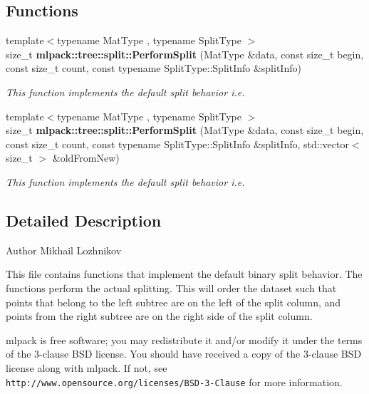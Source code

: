 \subsection*{Functions}
\begin{DoxyCompactItemize}
\item 
{\footnotesize template$<$typename Mat\+Type , typename Split\+Type $>$ }\\size\+\_\+t {\bf mlpack\+::tree\+::split\+::\+Perform\+Split} (Mat\+Type \&data, const size\+\_\+t begin, const size\+\_\+t count, const typename Split\+Type\+::\+Split\+Info \&split\+Info)
\begin{DoxyCompactList}\small\item\em This function implements the default split behavior i.\+e. \end{DoxyCompactList}\item 
{\footnotesize template$<$typename Mat\+Type , typename Split\+Type $>$ }\\size\+\_\+t {\bf mlpack\+::tree\+::split\+::\+Perform\+Split} (Mat\+Type \&data, const size\+\_\+t begin, const size\+\_\+t count, const typename Split\+Type\+::\+Split\+Info \&split\+Info, std\+::vector$<$ size\+\_\+t $>$ \&old\+From\+New)
\begin{DoxyCompactList}\small\item\em This function implements the default split behavior i.\+e. \end{DoxyCompactList}\end{DoxyCompactItemize}


\subsection{Detailed Description}
\begin{DoxyAuthor}{Author}
Mikhail Lozhnikov
\end{DoxyAuthor}
This file contains functions that implement the default binary split behavior. The functions perform the actual splitting. This will order the dataset such that points that belong to the left subtree are on the left of the split column, and points from the right subtree are on the right side of the split column.

mlpack is free software; you may redistribute it and/or modify it under the terms of the 3-\/clause B\+SD license. You should have received a copy of the 3-\/clause B\+SD license along with mlpack. If not, see {\tt http\+://www.\+opensource.\+org/licenses/\+B\+S\+D-\/3-\/\+Clause} for more information. 
